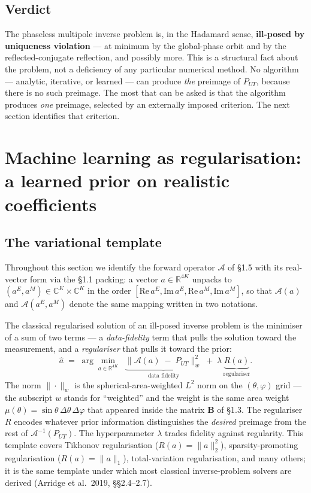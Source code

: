 \documentclass[11pt,a4paper]{report}
\begin{document}
\subsection*{Verdict}

The phaseless multipole inverse problem is, in the Hadamard sense,
\textbf{ill-posed by uniqueness violation} --- at minimum by the global-phase orbit
and by the reflected-conjugate reflection, and possibly more. This is a structural
fact about the problem, not a deficiency of any particular numerical method. No
algorithm --- analytic, iterative, or learned --- can produce \emph{the} preimage of
$P_{UT}$, because there is no such preimage. The most that can be asked is that the
algorithm produces \emph{one} preimage, selected by an externally imposed criterion.
The next section identifies that criterion.
\section{Machine learning as regularisation: a learned prior on realistic coefficients}

\subsection*{The variational template}

Throughout this section we identify the forward operator $\mathcal A$ of \S1.5 with
its real-vector form via the \S1.1 packing: a vector $a \in \mathbb{R}^{4K}$ unpacks
to $(a^E, a^M) \in \mathbb{C}^K \times \mathbb{C}^K$ in the order
$[\mathrm{Re}\,a^E, \mathrm{Im}\,a^E, \mathrm{Re}\,a^M, \mathrm{Im}\,a^M]$, so that
$\mathcal A(a)$ and $\mathcal A(a^E, a^M)$ denote the same mapping written in two
notations.

The classical regularised solution of an ill-posed inverse problem is the minimiser
of a sum of two terms --- a \emph{data-fidelity} term that pulls the solution toward
the measurement, and a \emph{regulariser} that pulls it toward the prior:
\[
\hat a \;=\;\arg\min_{a\in\mathbb{R}^{4K}} \;\;\underbrace{\bigl\|\mathcal{A}(a) \;-\; P_{UT}\bigr\|_{w}^{2}}_{\text{data fidelity}} \;+\; \lambda\,\underbrace{R(a)}_{\text{regulariser}}.
\]
The norm $\|\cdot\|_w$ is the spherical-area-weighted $L^2$ norm on the
$(\theta,\varphi)$ grid --- the subscript $w$ stands for \enquote{weighted} and the
weight is the same area weight $\mu(\theta) = \sin\theta\,\Delta\theta\,\Delta\varphi$
that appeared inside the matrix $\mathbf B$ of \S1.3. The regulariser $R$ encodes
whatever prior information distinguishes the \emph{desired} preimage from the rest of
$\mathcal{A}^{-1}(P_{UT})$. The hyperparameter $\lambda$ trades fidelity against
regularity. This template covers Tikhonov regularisation ($R(a) = \|a\|_2^2$),
sparsity-promoting regularisation ($R(a) = \|a\|_1$), total-variation regularisation,
and many others; it is the same template under which most classical inverse-problem
solvers are derived (Arridge et al.~2019, \S\S2.4--2.7).
\end{document}
